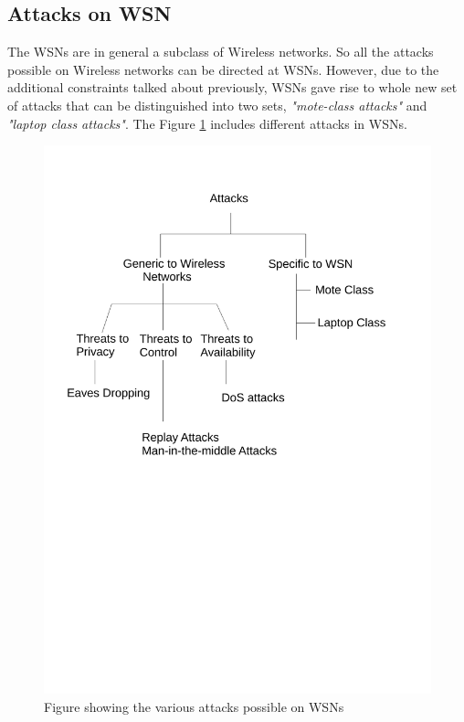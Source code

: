 \documentclass[a4paper,12pt]{report}
\begin{document}
\subsection{Attacks on WSN}
The WSNs are in general a subclass of Wireless networks. So all the
attacks possible on Wireless networks can be directed at WSNs.
However, due to the additional constraints talked about previously,
WSNs gave rise to whole new set of attacks that can be distinguished
into two sets, \textit{"mote-class attacks"} and \textit{"laptop
class attacks"}. The Figure \ref{JJ1} includes different attacks in
WSNs.

\begin{figure}[ht]
\begin{center}
\includegraphics[trim =100 250 100 50, scale=0.5]{./Attacks}
\end{center}
\caption{Figure showing the various attacks possible on WSNs}
\label{JJ1}
\end{figure}
\end{document}
